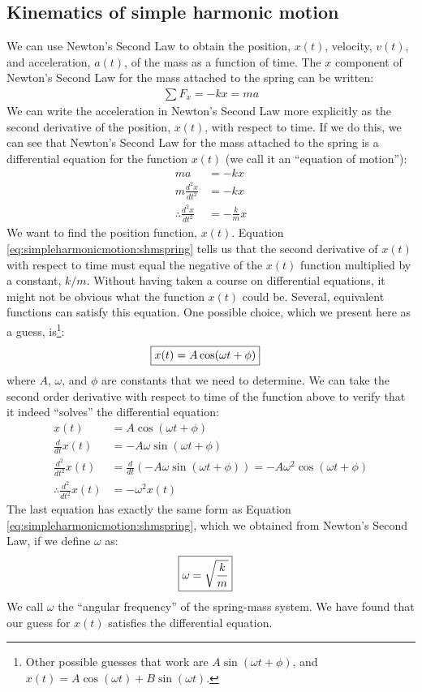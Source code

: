 \subsection{Kinematics of simple harmonic motion}
We can use Newton's Second Law to obtain the position, $x(t)$, velocity, $v(t)$, and acceleration, $a(t)$, of the mass as a function of time. The $x$ component of Newton's Second Law for the mass attached to the spring can be written:
\begin{align*}
\sum F_x = -kx = ma
\end{align*}
We can write the acceleration in Newton's Second Law more explicitly as the second derivative of the position, $x(t)$, with respect to time. If we do this, we can see that Newton's Second Law for the mass attached to the spring is a differential equation for the function $x(t)$ (we call it an ``equation of motion''):
\begin{align}
\label{eq:simpleharmonicmotion:shmspring}
ma &= -kx\nonumber\\
m\frac{d^2x}{dt^2} &= -kx\nonumber\\
\therefore \frac{d^2x}{dt^2} &= -\frac{k}{m}x
\end{align}
We want to find the position function, $x(t)$. Equation {\ref{eq:simpleharmonicmotion:shmspring}} tells us that the second derivative of $x(t)$ with respect to time must equal the negative of the $x(t)$ function multiplied by a constant, $k/m$. Without having taken a course on differential equations, it might not be obvious what the function $x(t)$ could be. Several, equivalent functions can satisfy this equation. One possible choice, which we present here as a guess, is\footnote{Other possible guesses that work are $A \sin(\omega t + \phi)$, and $x(t) = A\cos(\omega t) + B\sin(\omega t)$.}:
\begin{align}
\Aboxed{x(t) = A \cos(\omega t + \phi)}
\end{align}
where $A$, $\omega$, and $\phi$ are constants that we need to determine. We can take the second order derivative with respect to time of the function above to verify that it indeed ``solves'' the differential equation:
\begin{align*}
x(t) &= A \cos(\omega t + \phi)\\
\frac{d}{dt}x(t) &= -A\omega\sin(\omega t + \phi)\\
\frac{d^2}{dt^2}x(t) &=\frac{d}{dt}\left( -A\omega\sin(\omega t + \phi)\right)= -A\omega^2\cos(\omega t + \phi)\\
\therefore \frac{d^2}{dt^2}x(t) &= - \omega^2 x(t)
\end{align*}
The last equation has exactly the same form as Equation \ref{eq:simpleharmonicmotion:shmspring}, which we obtained from Newton's Second Law, if we define $\omega$ as:
\begin{align}
\Aboxed{\omega = \sqrt{\frac{k}{m}}}
\end{align}
We call $\omega$ the ``angular frequency'' of the spring-mass system. We have found that our guess for $x(t)$ satisfies the differential equation. 

